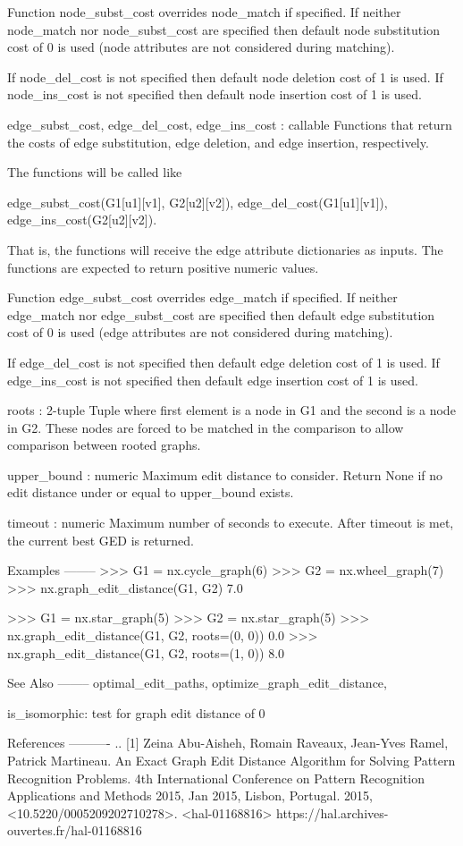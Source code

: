 \begin{DoxyVerb}
    Function node_subst_cost overrides node_match if specified.
    If neither node_match nor node_subst_cost are specified then
    default node substitution cost of 0 is used (node attributes
    are not considered during matching).

    If node_del_cost is not specified then default node deletion
    cost of 1 is used.  If node_ins_cost is not specified then
    default node insertion cost of 1 is used.

edge_subst_cost, edge_del_cost, edge_ins_cost : callable
    Functions that return the costs of edge substitution, edge
    deletion, and edge insertion, respectively.

    The functions will be called like

       edge_subst_cost(G1[u1][v1], G2[u2][v2]),
       edge_del_cost(G1[u1][v1]),
       edge_ins_cost(G2[u2][v2]).

    That is, the functions will receive the edge attribute
    dictionaries as inputs.  The functions are expected to return
    positive numeric values.

    Function edge_subst_cost overrides edge_match if specified.
    If neither edge_match nor edge_subst_cost are specified then
    default edge substitution cost of 0 is used (edge attributes
    are not considered during matching).

    If edge_del_cost is not specified then default edge deletion
    cost of 1 is used.  If edge_ins_cost is not specified then
    default edge insertion cost of 1 is used.

roots : 2-tuple
    Tuple where first element is a node in G1 and the second
    is a node in G2.
    These nodes are forced to be matched in the comparison to
    allow comparison between rooted graphs.

upper_bound : numeric
    Maximum edit distance to consider.  Return None if no edit
    distance under or equal to upper_bound exists.

timeout : numeric
    Maximum number of seconds to execute.
    After timeout is met, the current best GED is returned.

Examples
--------
>>> G1 = nx.cycle_graph(6)
>>> G2 = nx.wheel_graph(7)
>>> nx.graph_edit_distance(G1, G2)
7.0

>>> G1 = nx.star_graph(5)
>>> G2 = nx.star_graph(5)
>>> nx.graph_edit_distance(G1, G2, roots=(0, 0))
0.0
>>> nx.graph_edit_distance(G1, G2, roots=(1, 0))
8.0

See Also
--------
optimal_edit_paths, optimize_graph_edit_distance,

is_isomorphic: test for graph edit distance of 0

References
----------
.. [1] Zeina Abu-Aisheh, Romain Raveaux, Jean-Yves Ramel, Patrick
   Martineau. An Exact Graph Edit Distance Algorithm for Solving
   Pattern Recognition Problems. 4th International Conference on
   Pattern Recognition Applications and Methods 2015, Jan 2015,
   Lisbon, Portugal. 2015,
   <10.5220/0005209202710278>. <hal-01168816>
   https://hal.archives-ouvertes.fr/hal-01168816\end{DoxyVerb}
